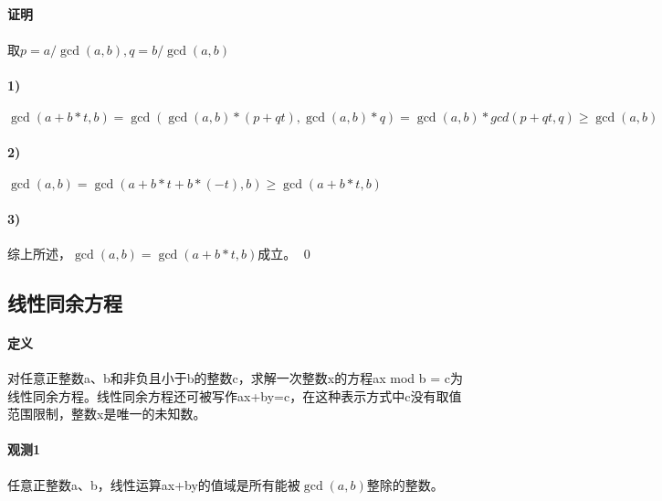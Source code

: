 \documentclass[UTF8]{ctexart}
\begin{document}
    \paragraph{证明}
    \paragraph{} 取$p=a/\gcd(a,b), q=b/\gcd(a,b)$
    \paragraph{1)} $\gcd(a+b*t,b)=\gcd(\gcd(a,b)*(p+qt),\gcd(a,b)*q)=\gcd(a,b)*gcd(p+qt,q)\geq\gcd(a,b)$
    \paragraph{2)} $\gcd(a,b)=\gcd(a+b*t+b*(-t),b)\geq\gcd(a+b*t,b)$
    \paragraph{3)} 综上所述，$\gcd(a,b)=\gcd(a+b*t,b)$成立。 \qed
    \subsection{线性同余方程}
    \paragraph{定义} 对任意正整数a、b和非负且小于b的整数c，求解一次整数x的方程ax mod b = c为线性同余方程。线性同余方程还可被写作ax+by=c，在这种表示方式中c没有取值范围限制，整数x是唯一的未知数。
    \paragraph{观测1} 任意正整数a、b，线性运算ax+by的值域是所有能被$\gcd(a,b)$整除的整数。
\end{document}

